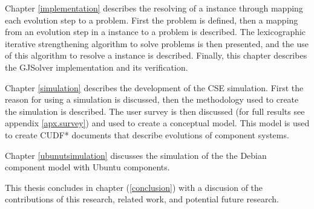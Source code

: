 Chapter \ref{implementation} describes the resolving of a \modelname instance through mapping each evolution step to a \modelimpl problem.
First the \modelimpl problem is defined, then a mapping from an evolution step in a \modelname instance to a \modelimpl problem is described.
The lexicographic iterative strengthening algorithm to solve \modelimpl problems is then presented, and the use of this algorithm to resolve a \modelname instance is described.
Finally, this chapter describes the GJSolver implementation and its verification.

Chapter \ref{simulation} describes the development of the CSE simulation.
First the reason for using a simulation is discussed, then the methodology used to create the simulation is described.
The user survey is then discussed (for full results see appendix \ref{apx.survey}) and used to create a conceptual model.
This model is used to create CUDF* documents that describe evolutions of component systems. 

Chapter \ref{ubunutsimulation} discusses the simulation of the  the Debian component model \citep{Barth2005} with Ubuntu  components. 

This thesis concludes in chapter (\ref{conclusion}) with a discusion of the contributions of this research, related work, and potential future research.